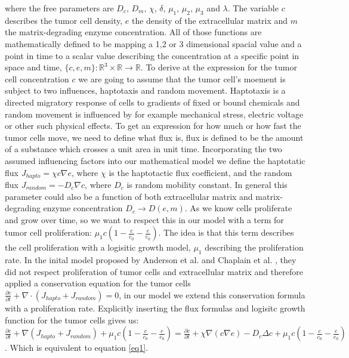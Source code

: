 where the free parameters are $D_c$, $D_m$, $\chi$, $\delta$, $\mu_1$, $\mu_2$, $\mu_3$ and $\lambda$. \newline
The variable $c$ describes the tumor cell density, $e$ the density of the extracellular matrix and $m$ the matrix-degrading enzyme concentration. All of those functions are mathematically defined to be mapping a 1,2 or 3 dimensional spacial value and a point in time to a scalar value describing the concentration at a specific point in space and time, $\{c,e,m\} : \mathbb{R}^{3} \times \mathbb{R} \rightarrow \mathbb{R}$.\newline
To derive at the expression for the tumor cell concentration $c$ we are going to assume that the tumor cell's moement is subject to two influences, haptotaxis and random movement. Haptotaxis is a directed migratory response of cells to gradients of fixed or bound chemicals \cite{anderson_continuous_1998} and random movement is influenced by for example mechanical stress, electric voltage or other such physical effects. To get an expression for how much or how fast the tumor cells move, we need to define what flux is, flux is defined to be the amount of a substance  which crosses a unit area in unit time. Incorporating the two assumed influencing factors into our mathematical model we define the haptotatic flux $J_{hapto} = \chi c \nabla e$, where $\chi$ is the haptotactic flux coefficient, and the random flux $J_{random} = -D_c \nabla c$, where $D_c$ is random mobility constant. In general this parameter could also be a function of both extracellular matrix and matrix-degrading enzyme concentration $D_c \rightarrow D(e,m)$. As we know cells proliferate and grow over time, so we want to respect this in our model with a term for tumor cell proliferation: $\mu_1 c (1-\frac{c}{c_0} - \frac{e}{e_0})$. The idea is that this term describes the cell proliferation with a logisitic growth model, $\mu_1$ describing the proliferation rate.
In the inital model proposed by Anderson et al. \cite{anderson_continuous_1998,anderson_mathematical_2000} 
and Chaplain et al. \cite{anderson_continuous_1998,chaplain_mathematical_2006,chaplain_mathematical_2006-1,franssen_mathematical_2019}, they did not respect proliferation of tumor cells and extracellular matrix and therefore applied a conservation equation for the tumor cells $\frac{\partial c}{\partial t} + \nabla \cdot (J_{hapto} + J_{random}) = 0$, in our model we extend this conservation formula with a proliferation rate. Explicitly inserting the flux formulas and logisitc growth function for the tumor cells gives us: $\frac{\partial c}{\partial t} + \nabla (J_{hapto} + J_{random}) + \mu_1 c (1-\frac{c}{c_0} - \frac{e}{e_0}) = \frac{\partial c}{\partial t} + \chi \nabla (c \nabla e) - D_c \Delta c + \mu_1 c (1-\frac{c}{c_0} - \frac{e}{e_0})$. Which is equivalent to equation \ref*{eq1}.\newline
